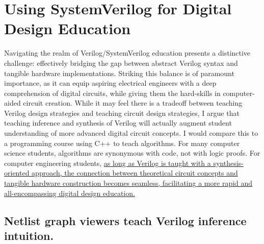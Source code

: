 
\chapter{Using SystemVerilog for Digital Design Education}
\label{chapter:digital_design}

Navigating the realm of Verilog/SystemVerilog education presents a distinctive challenge: effectively bridging the gap between abstract Verilog syntax and tangible hardware implementations. Striking this balance is of paramount importance, as it can equip aspiring electrical engineers with a deep comprehension of digital circuits, while giving them the hard-skills in computer-aided circuit creation. While it may feel there is a tradeoff between teaching Verilog design strategies and teaching circuit design strategies, I argue that teaching inference and synthesis of Verilog will actually augment student understanding of more advanced digital circuit concepts. I would compare this to a programming course using C++ to teach algorithms. For many computer science students, algorithms are synonymous with code, not with logic proofs. For computer engineering students, \ul{as long as Verilog is taught with a synthesis-oriented approach, the connection between theoretical circuit concepts and tangible hardware construction becomes seamless, facilitating a more rapid and all-encompassing digital design education.}

\section{Netlist graph viewers teach Verilog inference intuition.}

